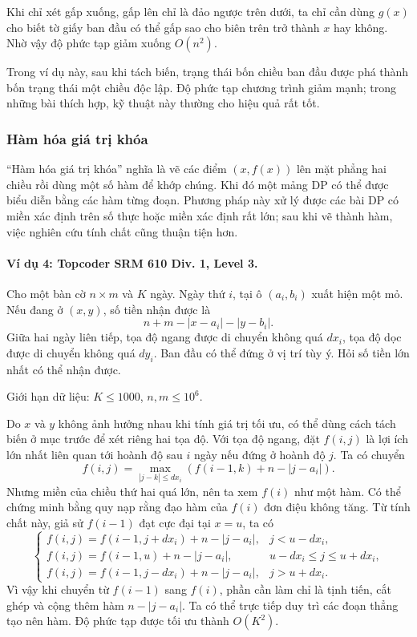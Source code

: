 \documentclass[11pt]{article}
\begin{document}
Khi chỉ xét gấp xuống, gấp lên chỉ là đảo ngược trên dưới, ta chỉ cần dùng
\(g(x)\) cho biết tờ giấy ban đầu có thể gấp sao cho biên trên trở thành \(x\)
hay không. Nhờ vậy độ phức tạp giảm xuống \(O(n^2)\).

Trong ví dụ này, sau khi tách biến, trạng thái bốn chiều ban đầu được phá thành
bốn trạng thái một chiều độc lập. Độ phức tạp chương trình giảm mạnh; trong
những bài thích hợp, kỹ thuật này thường cho hiệu quả rất tốt.

\subsubsection{Hàm hóa giá trị khóa}

``Hàm hóa giá trị khóa'' nghĩa là vẽ các điểm \((x,f(x))\) lên mặt phẳng hai
chiều rồi dùng một số hàm để khớp chúng. Khi đó một mảng DP có thể được biểu
diễn bằng các hàm từng đoạn. Phương pháp này xử lý được các bài DP có miền xác
định trên số thực hoặc miền xác định rất lớn; sau khi vẽ thành hàm, việc nghiên
cứu tính chất cũng thuận tiện hơn.

\paragraph{Ví dụ 4: Topcoder SRM 610 Div. 1, Level 3.}
Cho một bàn cờ \(n\times m\) và \(K\) ngày. Ngày thứ \(i\), tại ô
\((a_i,b_i)\) xuất hiện một mỏ. Nếu đang ở \((x,y)\), số tiền nhận được là
\[
  n+m-|x-a_i|-|y-b_i|.
\]
Giữa hai ngày liên tiếp, tọa độ ngang được di chuyển không quá \(dx_i\), tọa độ
dọc được di chuyển không quá \(dy_i\). Ban đầu có thể đứng ở vị trí tùy ý. Hỏi
số tiền lớn nhất có thể nhận được.

Giới hạn dữ liệu: \(K\le 1000\), \(n,m\le 10^6\).

Do \(x\) và \(y\) không ảnh hưởng nhau khi tính giá trị tối ưu, có thể dùng cách
tách biến ở mục trước để xét riêng hai tọa độ. Với tọa độ ngang, đặt \(f(i,j)\)
là lợi ích lớn nhất liên quan tới hoành độ sau \(i\) ngày nếu đứng ở hoành độ
\(j\). Ta có chuyển
\[
  f(i,j)=\max_{|j-k|\le dx_i}
  \left(f(i-1,k)+n-|j-a_i|\right).
\]
Nhưng miền của chiều thứ hai quá lớn, nên ta xem \(f(i)\) như một hàm. Có thể
chứng minh bằng quy nạp rằng đạo hàm của \(f(i)\) đơn điệu không tăng. Từ tính
chất này, giả sử \(f(i-1)\) đạt cực đại tại \(x=u\), ta có
\[
\begin{cases}
f(i,j)=f(i-1,j+dx_i)+n-|j-a_i|, & j<u-dx_i,\\
f(i,j)=f(i-1,u)+n-|j-a_i|, & u-dx_i\le j\le u+dx_i,\\
f(i,j)=f(i-1,j-dx_i)+n-|j-a_i|, & j>u+dx_i.
\end{cases}
\]
Vì vậy khi chuyển từ \(f(i-1)\) sang \(f(i)\), phần cần làm chỉ là tịnh tiến,
cắt ghép và cộng thêm hàm \(n-|j-a_i|\). Ta có thể trực tiếp duy trì các đoạn
thẳng tạo nên hàm. Độ phức tạp được tối ưu thành \(O(K^2)\).
\end{document}
